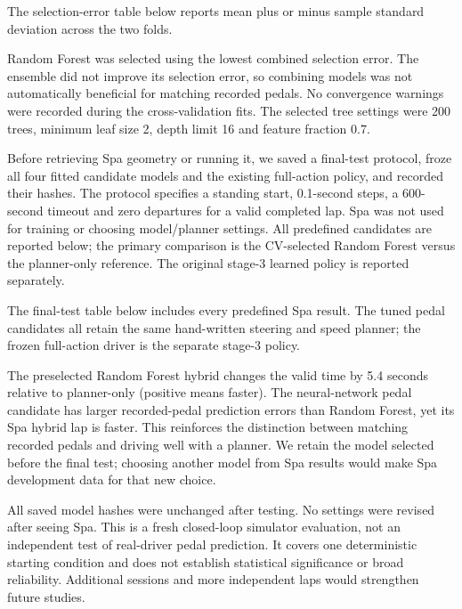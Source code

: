 \documentclass[11pt,a4paper]{article}
\begin{document}
The selection-error table below reports mean plus or minus sample standard deviation across the two folds. 

Random Forest was selected using the lowest combined selection error. The ensemble did not improve its selection error, so combining models was not automatically beneficial for matching recorded pedals. No convergence warnings were recorded during the cross-validation fits. The selected tree settings were 200 trees, minimum leaf size 2, depth limit 16 and feature fraction 0.7.

Before retrieving Spa geometry or running it, we saved a final-test protocol, froze all four fitted candidate models and the existing full-action policy, and recorded their hashes. The protocol specifies a standing start, 0.1-second steps, a 600-second timeout and zero departures for a valid completed lap. Spa was not used for training or choosing model/planner settings. All predefined candidates are reported below; the primary comparison is the CV-selected Random Forest versus the planner-only reference. The original stage-3 learned policy is reported separately.

The final-test table below includes every predefined Spa result. The tuned pedal candidates all retain the same hand-written steering and speed planner; the frozen full-action driver is the separate stage-3 policy. 

The preselected Random Forest hybrid changes the valid time by 5.4 seconds relative to planner-only (positive means faster). The neural-network pedal candidate has larger recorded-pedal prediction errors than Random Forest, yet its Spa hybrid lap is faster. This reinforces the distinction between matching recorded pedals and driving well with a planner. We retain the model selected before the final test; choosing another model from Spa results would make Spa development data for that new choice.

All saved model hashes were unchanged after testing. No settings were revised after seeing Spa. This is a fresh closed-loop simulator evaluation, not an independent test of real-driver pedal prediction. It covers one deterministic starting condition and does not establish statistical significance or broad reliability. Additional sessions and more independent laps would strengthen future studies.
\end{document}
